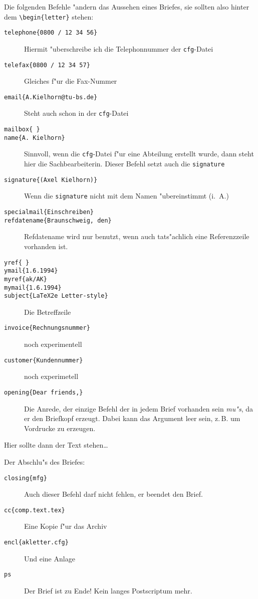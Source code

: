\documentclass[a4paper]{article}
\begin{document}
Die folgenden Befehle "andern das Aussehen eines Briefes, sie 
sollten also hinter dem \verb+\begin{letter}+ stehen:

\begin{description}
\item [\texttt{telephone\{0800 / 12 34 56\}}] Hiermit 
	"uberschreibe ich die Telephonnummer der 
	\texttt{cfg}-Datei
\item [\texttt{telefax\{0800 / 12 34 57\}}] Gleiches f"ur die Fax-Nummer
\item [\texttt{email\{A.Kielhorn@tu-bs.de\}}] Steht auch 
	schon in der \texttt{cfg}-Datei
\item [\texttt{mailbox\{ \}}]
\item [\texttt{name\{A. Kielhorn\}}] Sinnvoll, wenn die 
	\texttt{cfg}-Datei f"ur eine Abteilung erstellt wurde, 
	dann steht hier die Sachbearbeiterin. Dieser Befehl 
	setzt auch die \texttt{signature}
\item [\texttt{signature\{(Axel Kielhorn)\}}] Wenn die 
	\texttt{signature} nicht mit dem Namen "ubereinstimmt 
	(i.~A.)
\item [\texttt{specialmail\{Einschreiben\}}]
\item [\texttt{refdatename\{Braunschweig, den\}}] Refdatename wird nur 
benutzt, wenn auch tats"achlich eine Referenzzeile vorhanden ist.
\item [\texttt{yref\{ \}}]
\item [\texttt{ymail\{1.6.1994\}}]
\item [\texttt{myref\{ak/AK\}}]
\item [\texttt{mymail\{1.6.1994\}}]
\item [\texttt{subject\{LaTeX2e Letter-style\}}] Die Betreffzeile
\item [\texttt{invoice\{Rechnungsnummer\}}] noch experimentell
\item [\texttt{customer\{Kundennummer\}}] noch experimetell
\item [\texttt{opening\{Dear friends,\}}] Die Anrede, der 
	einzige Befehl der in jedem Brief vorhanden sein 
	\emph{mu"s}, da er den Briefkopf erzeugt. Dabei kann das 
	Argument leer sein, z.\,B. um Vordrucke zu erzeugen.
\end{description}

Hier sollte dann der Text stehen\dots

Der Abschlu"s des Briefes:
\begin{description}
\item [\texttt{closing\{mfg\}}] Auch dieser Befehl darf nicht 
	fehlen, er beendet den Brief.
\item [\texttt{cc\{comp.text.tex\}}] Eine Kopie f"ur das Archiv
\item [\texttt{encl\{akletter.cfg\}}] Und eine Anlage
\item [\texttt{ps}] Der Brief ist zu Ende! Kein langes 
	Postscriptum mehr.
\end{description}
\end{document}
